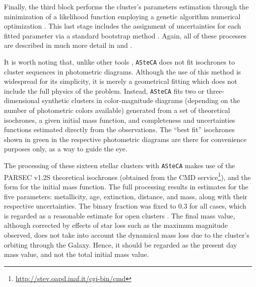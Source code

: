 \documentclass[draft]{aa}
\begin{document}
Finally, the third block performs the cluster's parameters estimation through
the minimization of a likelihood function \citep{Dolphin_2002} employing a
genetic algorithm numerical optimization \citep{Charbonneau_1995}. This last
stage includes the assignment of uncertainties for each fitted parameter via a
standard bootstrap method \citep{efron1986}. Again, all of these processes are
described in much more detail in \cite{Perren_2015} and \cite{Perren_2017}.

It is worth noting that, unlike other tools \citep[e.g.:][]{Yen_2018},
\texttt{ASteCA} does not fit isochrones to cluster sequences in photometric
diagrams. Although the use of this method is widespread for its simplicity, it
is merely a geometrical fitting which does not include the full physics of the
problem. Instead, \texttt{ASteCA} fits two or three-dimensional synthetic
clusters in color-magnitude diagrams (depending on the number of photometric
colors available) generated from a set of theoretical isochrones, a given
initial mass function, and completeness and uncertainties functions estimated
directly from the observations. The ``best fit'' isochrones shown in green in
the respective photometric diagrams are there for convenience purposes only, as
a way to guide the eye.

The processing of these sixteen stellar clusters with \texttt{ASteCA} makes use
of the PARSEC v1.2S \citep{Bressan_2012} theoretical isochrones (obtained from
the CMD service\footnote{\url{http://stev.oapd.inaf.it/cgi-bin/cmd}}), and the
\cite{Kroupa_2002} form for the initial mass function. The full processing
results in estimates for the five parameters: metallicity, age, extinction,
distance, and mass, along with their respective uncertainties. The binary
fraction was fixed to 0.3 for all cases, which is regarded as a reasonable
estimate for open clusters \citep{Sollima_2010}. The final mass value, although
corrected by effects of star loss such as the maximum magnitude observed, does
not take into account the dynamical mass loss due to the cluster's orbiting
through the Galaxy. Hence, it should be regarded as the present day mass value,
and not the total initial mass value.
\end{document}
